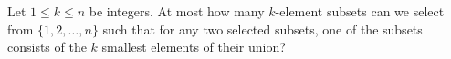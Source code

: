 Let $1\le k\le n$ be integers. At most how many $k$-element subsets can we select from $\{1,2,\dots,n\}$ such that for any two selected subsets, one of the subsets consists of the $k$ smallest elements of their union?